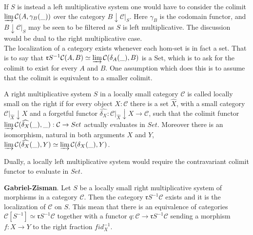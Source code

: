    If $S$ is instead a left multiplicative system one would have to consider the colimit $\varinjlim \mathcal{C}(A,\gamma_B(\_))$ over the category $B\downarrow \mathcal{C}|_{S}$. Here $\gamma_B$ is the codomain functor, and $B\downarrow \mathcal{C}|_{S}$ may be seen to be filtered as $S$ is left multiplicative. The discussion would be dual to the right multiplicative case. \\
 
    The localization of a category exists whenever each hom-set is in fact a set. That is to say that $\mathfrak{r}S^{-1}\mathcal{C}(A,B)\simeq\varinjlim\mathcal{C}(\delta_A(\_),B)$ is a Set, which is to ask for the colimit to exist for every $A$ and $B$. One assumption which does this is to assume that the colimit is equivalent to a smaller colimit.

    \begin{definition}
        A right multiplicative system $S$ in a locally small category $\mathcal{C}$ is called locally small on the right if for every object $X:\mathcal{C}$ there is a set $\widehat{X}$, with a small category $\mathcal{C}|_{\widehat{X}}\downarrow X$ and a forgetful functor $\widehat{\delta_X} : \mathcal{C}|_{\widehat{X}}\downarrow X \rightarrow \mathcal{C}$, such that the colimit functor $\varinjlim\mathcal{C}(\widehat{\delta_X}(\_),\_) : \mathcal{C} \rightarrow Set$ actually evaluates in $Set$. Moreover there is an isomorphism, natural in both arguments $X$ and $Y$, $\varinjlim\mathcal{C}(\widehat{\delta_X}(\_),Y)\simeq\varinjlim\mathcal{C}(\delta_X(\_),Y)$.

        Dually, a locally left multiplicative system would require the contravariant colimit functor to evaluate in $Set$.
    \end{definition}

    \begin{theorem}
        \textbf{Gabriel-Zisman}. Let $S$ be a locally small right multiplicative system of morphisms in a category $\mathcal{C}$. Then the category $\mathfrak{r}S^{-1}\mathcal{C}$ exists and it is the localization of $\mathcal{C}$ on $S$. This mean that there is an equivalence of categories $\mathcal{C}[S^{-1}]\simeq\mathfrak{r}S^{-1}\mathcal{C}$ together with a functor $q: \mathcal{C}\rightarrow\mathfrak{r}S^{-1}\mathcal{C}$ sending a morphism $f : X\rightarrow Y$ to the right fraction $fid_X^{-1}$.
    \end{theorem}

